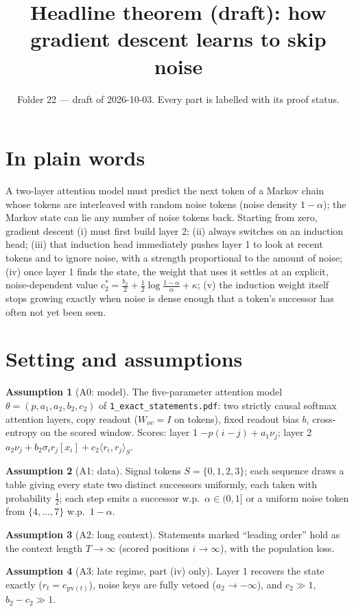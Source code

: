 \documentclass[11pt]{article}
\title{Headline theorem (draft): how gradient descent learns to skip noise}
\author{Folder 22 --- draft of 2026-10-03. Every part is labelled with its proof status.}
\date{}
\theoremstyle{definition}\newtheorem{assumption}{Assumption}
\theoremstyle{remark}\newtheorem{remark}{Remark}
\newcommand{\1}{\mathbf{1}}
\begin{document}
\maketitle

\section*{In plain words}
A two-layer attention model must predict the next token of a Markov chain whose tokens are
interleaved with random noise tokens (noise density $1-\alpha$); the Markov state can lie any number
of noise tokens back. Starting from zero, gradient descent (i) must first build layer 2;
(ii) always switches on an induction head; (iii) that induction head immediately pushes layer 1 to
look at recent tokens and to ignore noise, with a strength proportional to the amount of noise;
(iv) once layer 1 finds the state, the weight that uses it settles at an explicit,
noise-dependent value $c_2^\ast=\tfrac{b_2}2+\tfrac12\log\tfrac{1-\alpha}\alpha+\kappa$;
(v) the induction weight itself stops growing exactly when noise is dense enough that a token's
successor has often not yet been seen.

\section{Setting and assumptions}
\begin{assumption}[A0: model]
The five-parameter attention model $\theta=(p,a_1,a_2,b_2,c_2)$ of \texttt{1\_exact\_statements.pdf}: two
strictly causal softmax attention layers, copy readout ($W_{ov}=I$ on tokens), fixed readout bias $b$,
cross-entropy on the scored window. Scores: layer 1 $-p(i-j)+a_1\nu_j$; layer 2
$a_2\nu_j+b_2\sigma_ir_j[x_i]+c_2\langle r_i,r_j\rangle_S$.
\end{assumption}
\begin{assumption}[A1: data]
Signal tokens $S=\{0,1,2,3\}$; each sequence draws a table giving every state two distinct
successors uniformly, each taken with probability $\tfrac12$; each step emits a successor w.p.\
$\alpha\in(0,1]$ or a uniform noise token from $\{4,\dots,7\}$ w.p.\ $1-\alpha$.
\end{assumption}
\begin{assumption}[A2: long context]
Statements marked ``leading order'' hold as the context length $T\to\infty$ (scored positions
$i\to\infty$), with the population loss.
\end{assumption}
\begin{assumption}[A3: late regime, part (iv) only]
Layer 1 recovers the state exactly ($r_t=e_{\mathrm{pv}(t)}$), noise keys are fully vetoed
($a_2\to-\infty$), and $c_2\gg1$, $b_2-c_2\gg1$.
\end{assumption}
\end{document}
